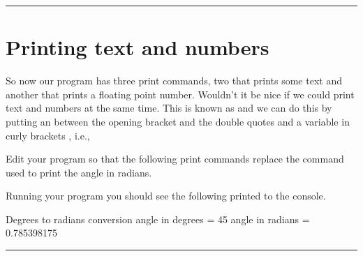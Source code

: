 \documentclass[letterpaper,10pt,english]{jupyterBook}
\begin{document}
\bigskip\hrule\bigskip



\part{Printing text and numbers}
\label{\detokenize{_pages/1.6_Printing_output:printing-text-and-numbers}}
\sphinxAtStartPar
So now our program has three print commands, two that prints some text and another that prints a floating point number. Wouldn’t it be nice if we could print text and numbers at the same time. This is known as  and we can do this by putting an  between the opening bracket and the double quotes  and a variable in curly brackets , i.e.,

\begin{sphinxVerbatim}[commandchars=\\\{\}]
\end{sphinxVerbatim}

\sphinxAtStartPar
Edit your program so that the following print commands replace the command used to print the angle in radians.

\begin{sphinxVerbatim}[commandchars=\\\{\}]
\end{sphinxVerbatim}

\sphinxAtStartPar
Running your program you should see the following printed to the console.

\begin{sphinxVerbatim}[commandchars=\\\{\}]
Degrees to radians conversion
angle in degrees = 45
angle in radians = 0.785398175
\end{sphinxVerbatim}


\bigskip\hrule\bigskip
\end{document}
